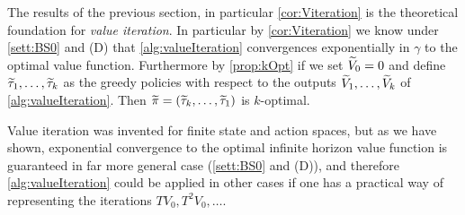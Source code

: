 The results of the previous section, in particular \cref{cor:Viteration}
is the theoretical foundation for
\emph{value iteration}.
In particular by \cref{cor:Viteration} we know under \cref{sett:BS0} and (D)
that \cref{alg:valueIteration}
convergences exponentially in $\gamma$ to the optimal value function.
Furthermore by \cref{prop:kOpt} if we set $\widetilde{V}_0 = 0$ and define
$\widetilde{\tau}_1, \dots, \widetilde{\tau}_k$ as the greedy policies with respect to
the outputs
$\widetilde{V}_1, \dots, \widetilde{V}_k$ of \cref{alg:valueIteration}. Then
$\widetilde{\pi} = (\widetilde{\tau}_k, \dots, \widetilde{\tau}_1)$ is $k$-optimal.

Value iteration was invented for finite state
and action spaces, but as we have shown, exponential convergence to the optimal
infinite horizon value function is guaranteed in far more general case
(\cref{sett:BS0} and (D)), and therefore \cref{alg:valueIteration} could be
applied in other cases if one has a practical way of representing the iterations
$TV_0, T^2V_0, \dots$. 

